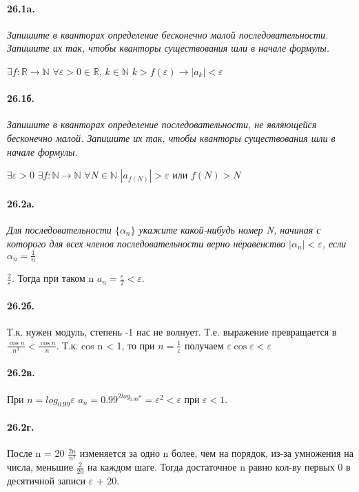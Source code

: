 \documentclass{book}
\begin{document}
\paragraph{26.1a.}
\textit{Запишите в кванторах определение бесконечно малой последовательности. Запишите их так, чтобы кванторы
существования шли в начале формулы.}

$\exists f: \mathbb{R} \to \mathbb{N}$ $\forall \varepsilon > 0 \in \mathbb{R}$, $k \in \mathbb{N}$ $k>f(\varepsilon) \rightarrow |a_k| < \varepsilon$

\paragraph{26.1б.}
\textit{Запишите в кванторах определение последовательности, не являющейся бесконечно малой. Запишите их так, чтобы кванторы
существования шли в начале формулы.}

$\exists \varepsilon > 0$ $\exists f: \mathbb{N} \to \mathbb{N}$ $\forall N \in \mathbb{N}$ $|a_{f(N)}| > \varepsilon$ или $f(N) > N$

\paragraph{26.2а.}
\textit{Для последовательности $\{\alpha_n\}$ укажите какой-нибудь номер N, начиная с которого для всех членов последовательности верно неравенство $|\alpha_n| < \varepsilon$, если $\alpha_n = \frac{1}{n}$}

$\frac{2}{\varepsilon}$. Тогда при таком n $a_n = \frac{\varepsilon}{2} < \varepsilon$.

\paragraph{26.2б.}
Т.к. нужен модуль, степень -1 нас не волнует. Т.е. выражение превращается в $\frac{\cos n}{n^3} < \frac{\cos n}{n}$. Т.к. cos n < 1, то при $n=\frac{1}{\varepsilon} $ получаем $\varepsilon \cos \varepsilon < \varepsilon$ 

\paragraph{26.2в.}
При $n = log_{0.99} \varepsilon$ $a_n = 0.99^{2log_{0.99}\varepsilon} = \varepsilon^2 < \varepsilon$ при $\varepsilon < 1$.

\paragraph{26.2г.}
После n = 20 $\frac{2n}{n!} $ изменяется за одно n более, чем на порядок, из-за умножения на числа, меньшие $\frac{2}{20}$ на каждом шаге. Тогда достаточное n равно кол-ву первых 0 в десятичной записи $\varepsilon$ + 20. 
\end{document}
